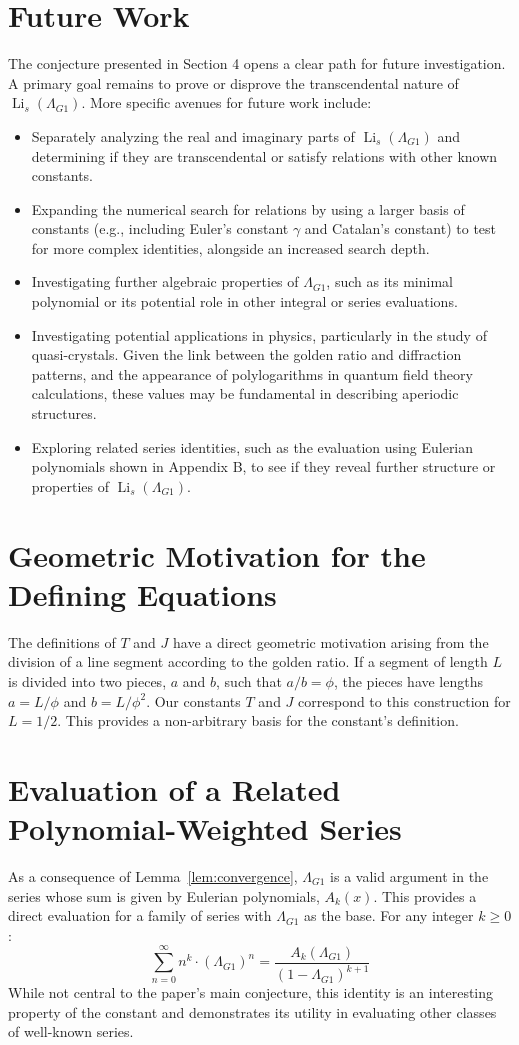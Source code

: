 \documentclass{amsart}
\theoremstyle{plain}
\theoremstyle{definition}
\theoremstyle{remark}
\DeclareMathOperator{\Li}{Li}
\newcommand{\LambdaG}{\Lambda_{G1}}
\newcommand{\phiG}{\phi}
\begin{document}
\section{Future Work}
The conjecture presented in Section 4 opens a clear path for future investigation. A primary goal remains to prove or disprove the transcendental nature of $\Li_s(\LambdaG)$. More specific avenues for future work include:
\begin{itemize}
    \item Separately analyzing the real and imaginary parts of $\Li_s(\LambdaG)$ and determining if they are transcendental or satisfy relations with other known constants.
    \item Expanding the numerical search for relations by using a larger basis of constants (e.g., including Euler's constant $\gamma$ and Catalan's constant) to test for more complex identities, alongside an increased search depth.
    \item Investigating further algebraic properties of $\LambdaG$, such as its minimal polynomial or its potential role in other integral or series evaluations.
    \item Investigating potential applications in physics, particularly in the study of quasi-crystals. Given the link between the golden ratio and diffraction patterns, and the appearance of polylogarithms in quantum field theory calculations, these values may be fundamental in describing aperiodic structures.
    \item Exploring related series identities, such as the evaluation using Eulerian polynomials shown in Appendix B, to see if they reveal further structure or properties of $\Li_s(\LambdaG)$.
\end{itemize}

\appendix
\section{Geometric Motivation for the Defining Equations}
The definitions of $T$ and $J$ have a direct geometric motivation arising from the division of a line segment according to the golden ratio. If a segment of length $L$ is divided into two pieces, $a$ and $b$, such that $a/b = \phiG$, the pieces have lengths $a=L/\phiG$ and $b=L/\phiG^2$. Our constants $T$ and $J$ correspond to this construction for $L=1/2$. This provides a non-arbitrary basis for the constant's definition.

\section{Evaluation of a Related Polynomial-Weighted Series}
As a consequence of Lemma~\ref{lem:convergence}, $\LambdaG$ is a valid argument in the series whose sum is given by Eulerian polynomials, $A_k(x)$. This provides a direct evaluation for a family of series with $\LambdaG$ as the base. For any integer $k \ge 0$:
\[ \sum_{n=0}^{\infty} n^k \cdot (\LambdaG)^n = \frac{A_k(\LambdaG)}{(1-\LambdaG)^{k+1}} \]
While not central to the paper's main conjecture, this identity is an interesting property of the constant and demonstrates its utility in evaluating other classes of well-known series.
\end{document}
